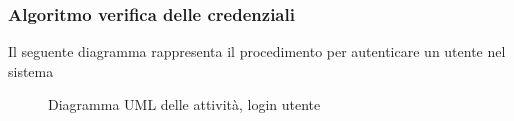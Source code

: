 \subsubsection{Algoritmo verifica delle credenziali}
Il seguente diagramma rappresenta il procedimento per autenticare un utente nel sistema
\vspace{0.5cm}
\begin{figure}[H]
    \centering
    \caption{Diagramma UML delle attività, login utente}
    \label{fig:activity_user_login}
\end{figure}